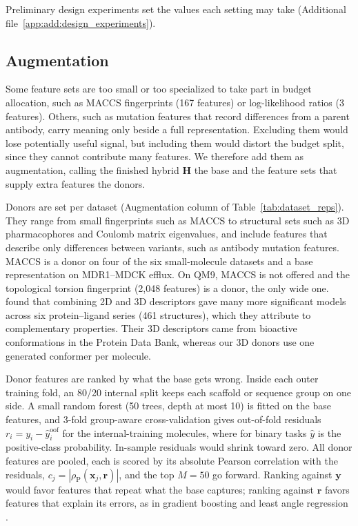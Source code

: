 Preliminary design experiments set the values each setting may take (Additional file~\ref{app:add:design_experiments}).





\subsection{Augmentation}\label{sec:method:augmentation}


Some feature sets are too small or too specialized to take part in budget allocation, such as MACCS fingerprints (167 features) or log-likelihood ratios (3 features). Others, such as mutation features that record differences from a parent antibody, carry meaning only beside a full representation. Excluding them would lose potentially useful signal, but including them would distort the budget split, since they cannot contribute many features. We therefore add them as augmentation, calling the finished hybrid $\mathbf{H}$ the base and the feature sets that supply extra features the donors.


Donors are set per dataset (Augmentation column of Table~\ref{tab:dataset_reps}). They range from small fingerprints such as MACCS to structural sets such as 3D pharmacophores and Coulomb matrix eigenvalues, and include features that describe only differences between variants, such as antibody mutation features. MACCS is a donor on four of the six small-molecule datasets and a base representation on MDR1--MDCK efflux. On QM9, MACCS is not offered and the topological torsion fingerprint (2,048 features) is a donor, the only wide one. \citet{Bahia2023} found that combining 2D and 3D descriptors gave many more significant models across six protein--ligand series (461 structures), which they attribute to complementary properties. Their 3D descriptors came from bioactive conformations in the Protein Data Bank, whereas our 3D donors use one generated conformer per molecule.

Donor features are ranked by what the base gets wrong. Inside each outer training fold, an 80/20 internal split keeps each scaffold or sequence group on one side. A small random forest (50 trees, depth at most 10) is fitted on the base features, and 3-fold group-aware cross-validation gives out-of-fold residuals $r_i = y_i - \hat{y}^{\mathrm{oof}}_i$ for the internal-training molecules, where for binary tasks $\hat{y}$ is the positive-class probability. In-sample residuals would shrink toward zero. All donor features are pooled, each is scored by its absolute Pearson correlation with the residuals, $c_j = |\rho_{\mathrm{P}}(\mathbf{x}_j, \mathbf{r})|$, and the top $M = 50$ go forward. Ranking against $\mathbf{y}$ would favor features that repeat what the base captures; ranking against $\mathbf{r}$ favors features that explain its errors, as in gradient boosting \citep{friedman2001greedy} and least angle regression \citep{efron2004lars}.

